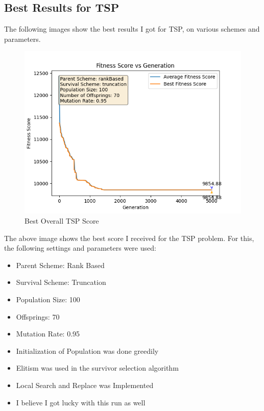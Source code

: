 \documentclass{article}
\theoremstyle{mytheoremstyle}
\theoremstyle{mytheoremstyle}
\theoremstyle{myproblemstyle}
\begin{document}
\subsection{Best Results for TSP}
The following images show the best results I got for TSP, on various schemes and parameters.

\begin{figure}[H]
    \centering
    \includegraphics[width=\textwidth]{Results/noteworthy/best_tsp_rank_trunc.png}
    \caption{Best Overall TSP Score}
\end{figure}
The above image shows the best score I received for the TSP problem. For this, the following settings and parameters were used: \vspace*{-2mm} \begin{itemize}
    \item Parent Scheme: Rank Based \vspace*{-2mm}
    \item Survival Scheme: Truncation \vspace*{-2mm}
    \item Population Size: 100 \vspace*{-2mm}
    \item Offsprings: 70 \vspace*{-2mm}
    \item Mutation Rate: 0.95 \vspace*{-2mm}
    \item Initialization of Population was done greedily \vspace*{-2mm}
    \item Elitism was used in the survivor selection algorithm \vspace*{-2mm}
    \item Local Search and Replace was Implemented \vspace*{-2mm}
    \item I believe I got lucky with this run as well
\end{itemize}
\end{document}
